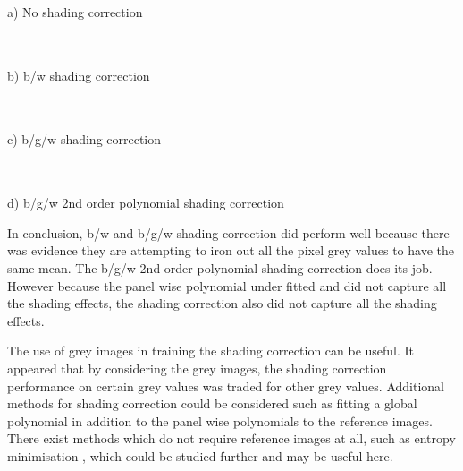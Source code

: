 \documentclass[a4paper]{proc}
\begin{document}
\begin{table*}
	\centering
	\begin{tabular}{c|c|c}
		
	\end{tabular}
	\\
	\vspace{.25cm}
	a) No shading correction
	\\\vspace{.5cm}
	\begin{tabular}{c|c|c}
		
	\end{tabular}
	\\
	\vspace{.25cm}
	b) b/w shading correction
	\\\vspace{.5cm}
	\begin{tabular}{c|c|c}
		
	\end{tabular}
	\\
	\vspace{.25cm}
	c) b/g/w shading correction
	\\\vspace{.5cm}
	\begin{tabular}{c|c|c}
		
	\end{tabular}
	\\
	\vspace{.25cm}
	d) b/g/w 2nd order polynomial shading correction
	\caption{Within pixel and between pixel variance of the shading corrected reference images. Values stated are the quartiles from 20 repeats of the experiment.}
	\label{table:bgw_anova}
\end{table*}

In conclusion, b/w and b/g/w shading correction did perform well because there was evidence they are attempting to iron out all the pixel grey values to have the same mean. The b/g/w 2nd order polynomial shading correction does its job. However because the panel wise polynomial under fitted and did not capture all the shading effects, the shading correction also did not capture all the shading effects.

The use of grey images in training the shading correction can be useful. It appeared that by considering the grey images, the shading correction performance on certain grey values was traded for other grey values. Additional methods for shading correction could be considered such as fitting a global polynomial in addition to the panel wise polynomials to the reference images. There exist methods which do not require reference images at all, such as entropy minimisation \cite{likar2000retrospective}, which could be studied further and may be useful here.
\end{document}
